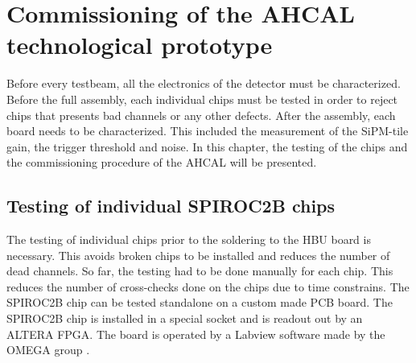 \chapter{Commissioning of the AHCAL technological prototype}

Before every testbeam, all the electronics of the detector must be characterized. Before the full assembly, each individual chips must be tested in order to reject chips that presents bad channels or any other defects. After the assembly, each board needs to be characterized. This included the measurement of the SiPM-tile gain, the trigger threshold and noise. In this chapter, the testing of the chips and the commissioning procedure of the AHCAL will be presented.

\section{Testing of individual SPIROC2B chips}

The testing of individual chips prior to the soldering to the HBU board is necessary. This avoids broken chips to be installed and reduces the number of dead channels. So far, the testing had to be done manually for each chip. This reduces the number of cross-checks done on the chips due to time constrains. The SPIROC2B chip can be tested standalone on a custom made PCB board. The SPIROC2B chip is installed in a special socket and is readout out by an ALTERA FPGA. The board is operated by a Labview software made by the OMEGA group \cite{OmegaWeb}.

